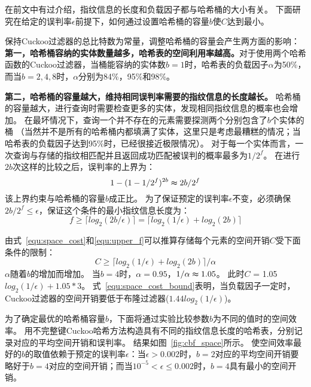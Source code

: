 在前文中有过介绍，指纹信息的长度和负载因子都与哈希桶的大小有关。
下面研究在给定的误判率$\epsilon$前提下，如何通过设置哈希桶的容量$b$使$C$达到最小。

保持Cuckoo过滤器的总比特数为常量，调整哈希桶的容量会产生两方面的影响：
\textbf{第一，哈希桶容纳的实体数量越多，哈希表的空间利用率越高。}对于使用两个哈希函数的Cuckoo过滤器，当桶能容纳的实体数$b = 1$时，哈希表的负载因子$\alpha$为50\%，
而当$b = 2,4,8$时，$\alpha$分别为84\%，95\%和98\%。

\textbf{第二，哈希桶的容量越大，维持相同误判率需要的指纹信息的长度越长。}
哈希桶的容量越大，进行查询时需要检查更多的实体，发现相同指纹信息的概率也会增加。
在最坏情况下，查询一个并不存在的元素需要探测两个分别包含了$b$个实体的桶
（当然并不是所有的哈希桶内都填满了实体，这里只是考虑最糟糕的情况；当哈希表的负载因子达到95\%时，已经很接近极限情况）。
对于每一个实体而言，一次查询与存储的指纹相匹配并且返回成功匹配被误判的概率最多为${1/2^f}$。
在进行$2b$次这样的比较之后，误判率的上界为：
\begin{equation}
1 - (1 - {1/2^f})^{2b} \thickapprox {2b/2^f}
\end{equation}
该上界约束与哈希桶的容量$b$成正比。
为了保证预定的误判率$\epsilon$不变，必须确保${2b/2^f}\leq \epsilon$，保证这个条件的最小指纹信息长度为：
\begin{equation}
f \geq \lceil log_2({2b/\epsilon})\rceil = \lceil log_2({1/\epsilon}) + log_2(2b)\rceil  
\label{equ:upper_f}
\end{equation}

由式~\ref{equ:space_cost}和\ref{equ:upper_f}可以推算存储每个元素的空间开销$C$受下面条件的限制：
\begin{equation}
C \geq {\lceil log_2({1/\epsilon}) + log_2(2b)\rceil /\alpha}
\label{equ:space_cost_bound}
\end{equation}
$\alpha$随着$b$的增加而增加。
当$b = 4$时，$\alpha = 0.95$，${1/\alpha} \thickapprox 1.05$。
此时$C$ = 1.05$log_2({1/\epsilon}) + 1.05 * 3$。
式~\ref{equ:space_cost_bound}表明，当负载因子一定时，Cuckoo过滤器的空间开销要低于布隆过滤器($1.44log_2({1/\epsilon})$)。

为了确定最优的哈希桶容量$b$，下面将通过实验比较参数$b$为不同的值时的空间效率。
用不完整键Cuckoo哈希方法构造具有不同的指纹信息长度的哈希表，分别记录对应的平均空间开销和误判率。
结果如图~\ref{fig:cbf_space}所示。
使空间效率最好的$b$的取值依赖于预定的误判率$\epsilon$：当$\epsilon > 0.002 $时，$b = 2$对应的平均空间开销要略好于$b = 4$对应的空间开销；而当$ 10^{-5} < \epsilon \leq 0.002$时，$b = 4$具有最小的空间开销。


